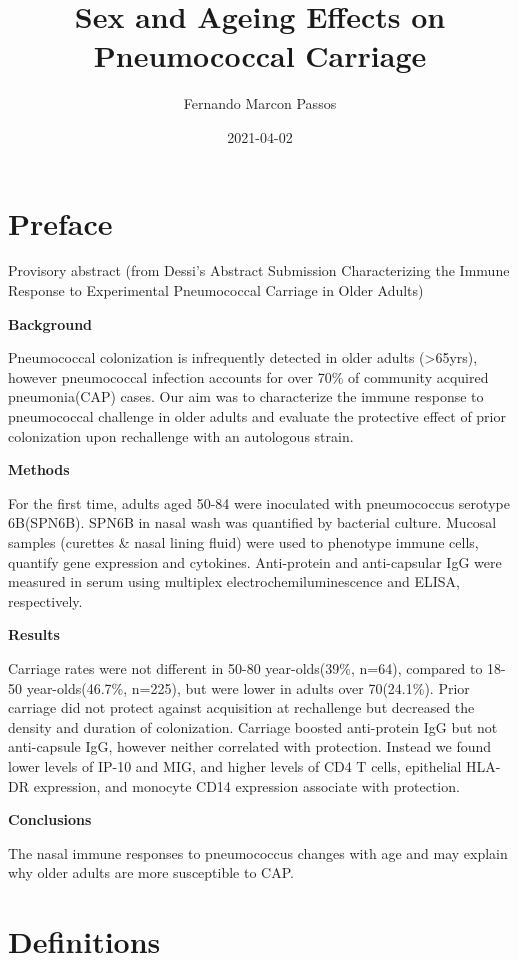 \documentclass[
]{book}
\title{Sex and Ageing Effects on Pneumococcal Carriage}
\author{Fernando Marcon Passos}
\date{2021-04-02}
\begin{document}
\maketitle

{
\setcounter{tocdepth}{1}
\tableofcontents
}
\hypertarget{preface}{%
\chapter*{Preface}\label{preface}}

Provisory abstract (from Dessi's Abstract Submission Characterizing the Immune Response to Experimental Pneumococcal Carriage in Older Adults)

\textbf{Background}

Pneumococcal colonization is infrequently detected in older adults (\textgreater65yrs), however pneumococcal infection accounts for over 70\% of community acquired pneumonia(CAP) cases. Our aim was to characterize the immune response to pneumococcal challenge in older adults and evaluate the protective effect of prior colonization upon rechallenge with an autologous strain.

\textbf{Methods}

For the first time, adults aged 50-84 were inoculated with pneumococcus serotype 6B(SPN6B). SPN6B in nasal wash was quantified by bacterial culture. Mucosal samples (curettes \& nasal lining fluid) were used to phenotype immune cells, quantify gene expression and cytokines. Anti-protein and anti-capsular IgG were measured in serum using multiplex electrochemiluminescence and ELISA, respectively.

\textbf{Results}

Carriage rates were not different in 50-80 year-olds(39\%, n=64), compared to 18-50 year-olds(46.7\%, n=225), but were lower in adults over 70(24.1\%). Prior carriage did not protect against acquisition at rechallenge but decreased the density and duration of colonization. Carriage boosted anti-protein IgG but not anti-capsule IgG, however neither correlated with protection. Instead we found lower levels of IP-10 and MIG, and higher levels of CD4 T cells, epithelial HLA-DR expression, and monocyte CD14 expression associate with protection.

\textbf{Conclusions}

The nasal immune responses to pneumococcus changes with age and may explain why older adults are more susceptible to CAP.

\hypertarget{definitions}{%
\chapter{Definitions}\label{definitions}}
\end{document}
